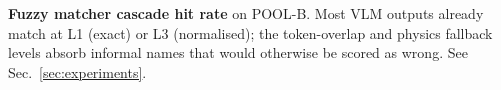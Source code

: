 \begin{table}[t]
  \centering
  \small
  
  \caption{\textbf{Fuzzy matcher cascade hit rate} on POOL-B.
  Most VLM outputs already match at L1 (exact) or L3 (normalised); the
  token-overlap and physics fallback levels absorb informal names that
  would otherwise be scored as wrong. See Sec.~\ref{sec:experiments}.}
  \label{tab:matcher_levels}
\end{table}
